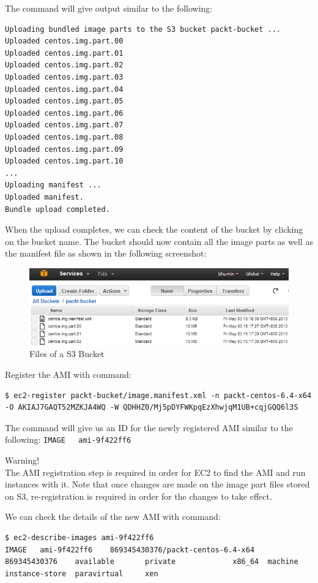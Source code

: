 The command will give output similar to the following:
\lstset{style=bashstyle}
\begin{lstlisting}
Uploading bundled image parts to the S3 bucket packt-bucket ...
Uploaded centos.img.part.00
Uploaded centos.img.part.01
Uploaded centos.img.part.02
Uploaded centos.img.part.03
Uploaded centos.img.part.04
Uploaded centos.img.part.05
Uploaded centos.img.part.06
Uploaded centos.img.part.07
Uploaded centos.img.part.08
Uploaded centos.img.part.09
Uploaded centos.img.part.10
...
Uploading manifest ...
Uploaded manifest.
Bundle upload completed.
\end{lstlisting}

When the upload completes, we can check the content of the bucket by clicking on the bucket name. The bucket should now contain all the image parts as well as the manifest file as shown in the following screenshot:
\begin{figure}[h]
  \centering
  \includegraphics[width=.8\textwidth]{figs/5163os_08_20.png}
  \caption{Files of a S3 Bucket}\label{fig:aws.bucket.content}
\end{figure} 

Register the AMI with command:
\lstset{style=bashstyle}
\begin{lstlisting}
$ ec2-register packt-bucket/image.manifest.xml -n packt-centos-6.4-x64 -O AKIAJ7GAQT52MZKJA4WQ -W QDHHZ0/Mj5pDYFWKpqEzXhwjqM1UB+cqjGQQ6l3S
\end{lstlisting}

The command will give us an ID for the newly registered AMI similar to the following:
\verb|IMAGE   ami-9f422ff6|
\begin{warning}
Warning!\\
The AMI registration step is required in order for EC2 to find the AMI and run instances with it. Note that once changes are made on the image part files stored on S3, re-registration is required in order for the changes to take effect.
\end{warning}

We can check the details of the new AMI with command:
\lstset{style=bashstyle}
\begin{lstlisting}
$ ec2-describe-images ami-9f422ff6
IMAGE   ami-9f422ff6    869345430376/packt-centos-6.4-x64       869345430376    available       private             x86_64  machine                         instance-store  paravirtual     xen
\end{lstlisting}

